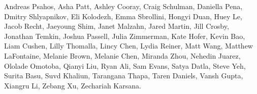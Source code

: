 Andreas Psahos,
Asha Patt,
Ashley Cooray,
Craig Schulman,
Daniella Pena,
Dmitry Shlyapnikov,
Eli Kolodezh,
Emma Sbrollini,
Hongyi Duan,
Huey Le,
Jacob Recht,
Jaeyoung Shim,
Janet Malzahn,
Jared Martin,
Jill Crosby,
Jonathan Temkin,
Joshua Passell,
Julia Zimmerman,
Kate Hofer,
Kevin Bao,
Liam Cushen,
Lilly Thomalla,
Lincy Chen,
Lydia Reiner,
Matt Wang,
Matthew LaFontaine,
Melanie Brown,
Melanie Chen,
Miranda Zhou,
Nehedin Juarez,
Ololade Omotoba,
Qianyi Liu,
Ryan Ali,
Sam Evans,
Satya Datla,
Steve Yeh,
Surita Basu,
Suvd Khaliun,
Tarangana Thapa,
Taren Daniels,
Vansh Gupta,
Xiangru Li,
Zebang Xu,
Zechariah Karsana.

